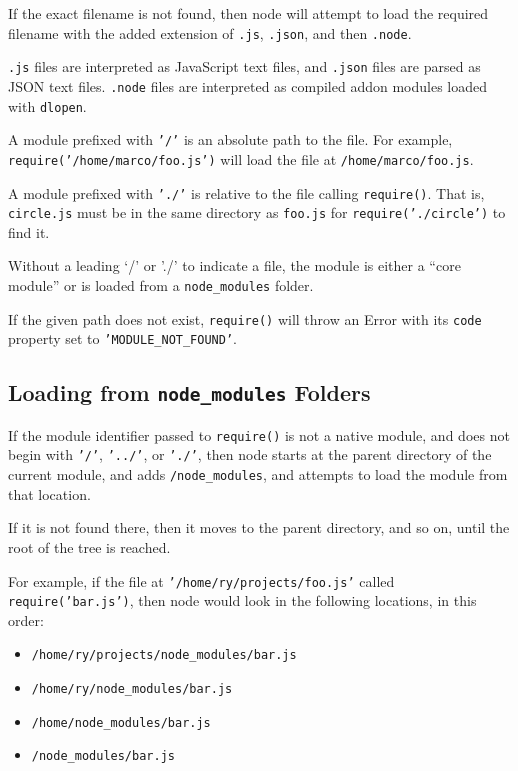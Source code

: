 If the exact filename is not found, then node will attempt to load the
required filename with the added extension of \texttt{.js},
\texttt{.json}, and then \texttt{.node}.

\texttt{.js} files are interpreted as JavaScript text files, and
\texttt{.json} files are parsed as JSON text files. \texttt{.node} files
are interpreted as compiled addon modules loaded with \texttt{dlopen}.

A module prefixed with \texttt{'/'} is an absolute path to the file. For
example, \texttt{require('/home/marco/foo.js')} will load the file at
\texttt{/home/marco/foo.js}.

A module prefixed with \texttt{'./'} is relative to the file calling
\texttt{require()}. That is, \texttt{circle.js} must be in the same
directory as \texttt{foo.js} for \texttt{require('./circle')} to find
it.

Without a leading `/' or './' to indicate a file, the module is either a
``core module'' or is loaded from a \texttt{node\_modules} folder.

If the given path does not exist, \texttt{require()} will throw an Error
with its \texttt{code} property set to \texttt{'MODULE\_NOT\_FOUND'}.

\subsection{Loading from \texttt{node\_modules} Folders}

If the module identifier passed to \texttt{require()} is not a native
module, and does not begin with \texttt{'/'}, \texttt{'../'}, or
\texttt{'./'}, then node starts at the parent directory of the current
module, and adds \texttt{/node\_modules}, and attempts to load the
module from that location.

If it is not found there, then it moves to the parent directory, and so
on, until the root of the tree is reached.

For example, if the file at \texttt{'/home/ry/projects/foo.js'} called
\texttt{require('bar.js')}, then node would look in the following
locations, in this order:

\begin{itemize}
\item
  \texttt{/home/ry/projects/node\_modules/bar.js}
\item
  \texttt{/home/ry/node\_modules/bar.js}
\item
  \texttt{/home/node\_modules/bar.js}
\item
  \texttt{/node\_modules/bar.js}
\end{itemize}

